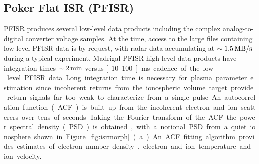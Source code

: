 \FloatBarrier
\subsection{Poker Flat ISR (PFISR)}\label{sec:fuspfisr}
PFISR produces several low-level data products including the complex analog-to-digital converter voltage samples.
At the time, access to the large files containing low-level PFISR data is by request, with radar data accumulating at $\sim \unit[1.5]{MB/s}$ during a typical experiment.
Madrigal PFISR high-level data products have integration times $\sim \unit[2]{min}$ versus \unit[10..100]{ms} cadence of the low-level PFISR data.
Long integration time is necessary for plasma parameter estimation since incoherent returns from the ionospheric volume target provide return signals far too weak to characterize from a single pulse.
An autocorrelation function (ACF) is built up from the incoherent electron and ion scatterers over tens of seconds.
Taking the Fourier transform of the ACF the power spectral density (PSD) is obtained, with a notional PSD from a quiet ionosphere shown in Figure~\ref{fig:isrmorph}(a).
An ACF fitting algorithm provides estimates of electron number density, electron and ion temperature and ion velocity.


